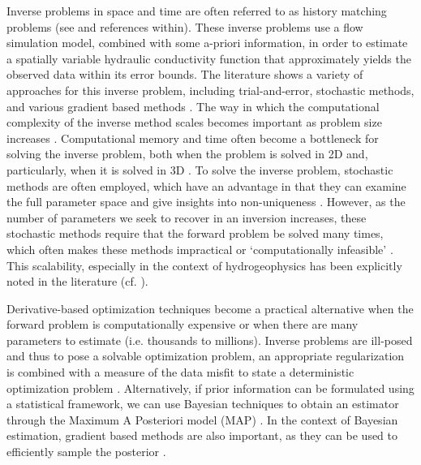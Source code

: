 \documentclass[preprint,review,3p,times,onecolumn,authoryear]{elsarticle}
\begin{document}
Inverse problems in space and time are often referred to as history matching problems (see \cite{DeanChen2011, OliverBook2008,  SarmaDurlofskyAziz2007, Oliver01, hydrusCalibration2012} and references within). These inverse problems use a flow simulation model, combined with some a-priori information, in order to estimate a spatially variable hydraulic conductivity function that approximately yields the observed data within its error bounds. The literature shows a variety of approaches for this inverse problem, including trial-and-error, stochastic methods, and various gradient based methods \citep{Bitterlich2004, Binley2002, Carrick2010, Durner1994, Finsterle2011c, Mualem1976, Simunek1996}. The way in which the computational complexity of the inverse method scales becomes important as problem size increases \citep{Towara2015}. Computational memory and time often become a bottleneck for solving the inverse problem, both when the problem is solved in 2D and, particularly, when it is solved in 3D \citep{hao}. To solve the inverse problem, stochastic methods are often employed, which have an advantage in that they can examine the full parameter space and give insights into non-uniqueness \citep{Finsterle2011}. However, as the number of parameters we seek to recover in an inversion increases, these stochastic methods require that the forward problem be solved many times, which often makes these methods impractical or `computationally infeasible' \citep{Linde2016}. This scalability, especially in the context of hydrogeophysics has been explicitly noted in the literature (cf. \cite{Binley2002, Deiana2007, Towara2015, Linde2016}).

Derivative-based optimization techniques become a practical alternative when the forward problem is computationally expensive or when there are many parameters to estimate (i.e. thousands to millions). Inverse problems are ill-posed and thus to pose a solvable optimization problem, an appropriate regularization is combined with a measure of the data misfit to state a deterministic optimization problem \citep{tikhonov1977}. Alternatively, if prior information can be formulated using a statistical framework, we can use Bayesian techniques to obtain an estimator through the Maximum A Posteriori model (MAP) \citep{somersallo}. In the context of Bayesian estimation, gradient based methods are also important, as they can be used to efficiently sample the posterior \citep{BuiThanhGhattas2015, Liu2017, Klein2017}.
\end{document}
